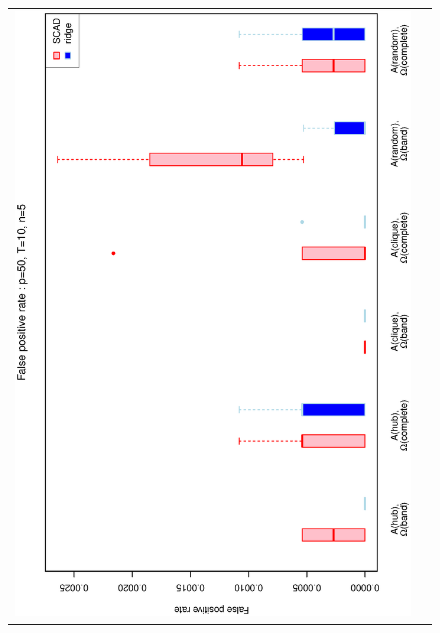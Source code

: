 \begin{figure}[h!]
\centering
\begin{tabular}{cc}
\includegraphics[scale=0.45,angle=270]{ROCfpr50T10N5_25.eps}
\\

\end{tabular}
\end{figure}
